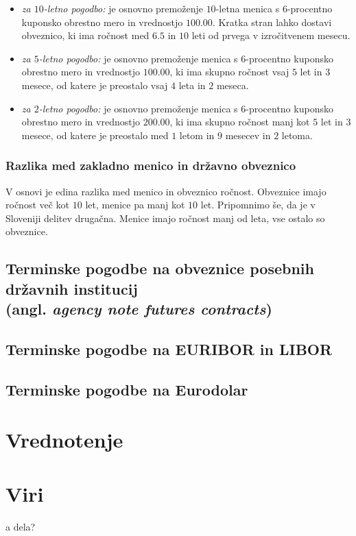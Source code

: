 \documentclass[a4paper]{article}
\begin{document}
\begin{itemize}
    \item \textit{za $10$-letno pogodbo:} je osnovno premoženje $10$-letna menica s $6$-procentno
            kuponsko obrestno mero in vrednostjo \textdollar$100.00$. Kratka stran lahko dostavi 
            obveznico, ki ima ročnost med $6.5$ in $10$ leti od prvega v izročitvenem mesecu.
    \item \textit{za $5$-letno pogodbo:} je osnovno premoženje menica s $6$-procentno kuponsko 
            obrestno mero in vrednostjo \textdollar$100.00$, ki ima skupno ročnost vsaj $5$ let
            in $3$ mesece, od katere je preostalo vsaj $4$ leta in $2$ meseca.
    \item \textit{za $2$-letno pogodbo:} je osnovno premoženje menica s $6$-procentno kuponsko 
    obrestno mero in vrednostjo \textdollar$200.00$, ki ima skupno ročnost manj kot $5$ let
    in $3$ mesece, od katere je preostalo med $1$ letom in $9$ mesecev in $2$ letoma.
\end{itemize} 

\subsubsection{Razlika med zakladno menico in državno obveznico}
V osnovi je edina razlika med menico in obveznico ročnost. Obveznice imajo ročnost več kot $10$
let, menice pa manj kot $10$ let. Pripomnimo še, da je v Sloveniji delitev drugačna. Menice imajo
ročnost manj od leta, vse ostalo so obveznice.

\subsection{Terminske pogodbe na obveznice posebnih državnih institucij \\
            (angl. \textit{agency note futures contracts})}

            
\subsection{Terminske pogodbe na EURIBOR in LIBOR}
\subsection{Terminske pogodbe na Eurodolar}

\section{Vrednotenje}

\section{Viri}
\begin{description}
    \item a dela?
\end{description}
\end{document}
